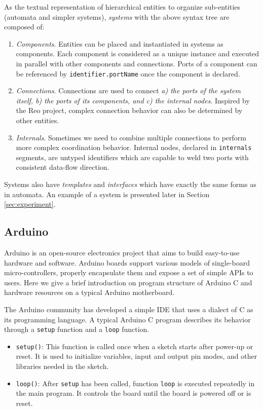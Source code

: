  As the textual representation of hierarchical entities to organize sub-entities (automata and simpler systems), \emph{systems} with the above syntax tree are composed of:
\begin{enumerate}
    \item \emph{Components}. Entities can be placed and instantiated in systems as components. Each component is considered as a unique instance and executed in parallel with other components and connections. Ports of a component can be referenced by \texttt{identifier.portName} once the component is declared.
    \item \emph{Connections}. Connections are used to connect \emph{a) the ports of the system itself, b) the ports of its components, and c) the internal nodes}. Inspired by the Reo project\cite{ArbabMscsReo2004,Arbab2007,BaierScp2006}, complex connection behavior can also be determined by other entities.
    \item \emph{Internals}. Sometimes we need to combine multiple connections to perform more complex coordination behavior. Internal nodes, declared in \texttt{internals} segments, are untyped identifiers which are capable to weld two ports with consistent data-flow direction.
\end{enumerate}

Systems also have \emph{templates} and \emph{interfaces} which have exactly the same forms as in automata. An example of a \lang{} system is presented later in %
Section \ref{sec:experiment}.

\subsection{Arduino}
\label{subsec:arduino}

Arduino\cite{margolis2011arduino} is an open-source electronics project that aims to build easy-to-use hardware and software. Arduino boards support various models of single-board micro-controllers, properly encapsulate them and expose a set of simple APIs to users. Here we give a brief introduction on program structure of Arduino C and hardware resources on a typical Arduino motherboard.

The Arduino community has developed a simple IDE that uses a dialect of C as its programming language. A typical Arduino C program describes its behavior through a \texttt{setup} function and a \texttt{loop} function. 
\begin{itemize}
    \item \texttt{setup()}: This function is called once when a sketch starts after power-up or reset. It is used to initialize variables, input and output pin modes, and other libraries needed in the sketch.
    \item \texttt{loop()}: After \texttt{setup} has been called, function \texttt{loop} is executed repeatedly in the main program. It controls the board until the board is powered off or is reset.
\end{itemize}

